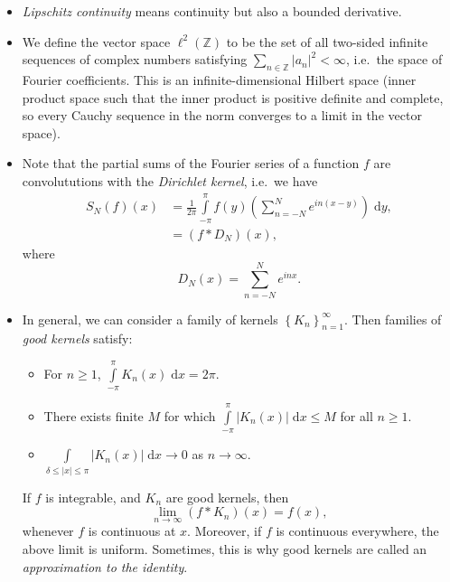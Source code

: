 \documentclass[11pt,
        usenames, %
        dvipsnames %
    ]{report}
\newcommand*{\abs}[1]{\left|#1\right|}
\newcommand*{\p}[1]{\left(#1\right)}
\newcommand*{\z}[1]{\left\{#1\right\}}
\begin{document}
\begin{itemize}
    \item \emph{Lipschitz continuity} means continuity but also a bounded
        derivative.

    \item We define the vector space $\ell^2(\mathbb{Z})$ to be the set of all
        two-sided infinite sequences of complex numbers satisfying
        $\sum\limits_{n \in \mathbb{Z}}\abs{a_n}^2 < \infty$, i.e.\ the space of
        Fourier coefficients. This is an infinite-dimensional Hilbert space
        (inner product space such that the inner product is positive definite
        and complete, so every Cauchy sequence in the norm converges to a limit
        in the vector space).

    \item Note that the partial sums of the Fourier series of a function $f$ are
        convolututions with the \emph{Dirichlet kernel}, i.e.\ we have
        \begin{align}
            S_N(f)(x) &= \frac{1}{2\pi}\int\limits_{-\pi}^\pi
                f(y)\p{\sum\limits_{n = -N}^N e^{in(x - y)}}\;\mathrm{d}y,\\
                &= \p{f * D_N}(x),
        \end{align}
        where
        \begin{equation}
            D_N(x) = \sum\limits_{n = -N}^N e^{inx}.
        \end{equation}

    \item In general, we can consider a family of kernels $\z{K_n}_{n =
        1}^\infty$. Then families of \emph{good kernels} satisfy:
        \begin{itemize}
            \item For $n \geq 1$, $\int\limits_{-\pi}^\pi K_n(x)\;\mathrm{d}x
                = 2\pi$.
            \item There exists finite $M$ for which $\int\limits_{-\pi}^\pi
                \abs{K_n(x)}\;\mathrm{d}x \leq M$ for all $n \geq 1$.
            \item $\int\limits_{\delta \leq \abs{x} \leq
                \pi}\abs{K_n(x)}\;\mathrm{d}x \to 0$ as $n \to \infty$.
        \end{itemize}
        If $f$ is integrable, and $K_n$ are good kernels, then
        \begin{equation}
            \lim_{n \to \infty} \p{f * K_n}(x) = f(x),
        \end{equation}
        whenever $f$ is continuous at $x$. Moreover, if $f$ is continuous
        everywhere, the above limit is uniform. Sometimes, this is why good
        kernels are called an \emph{approximation to the identity}.


\end{itemize}
\end{document}
